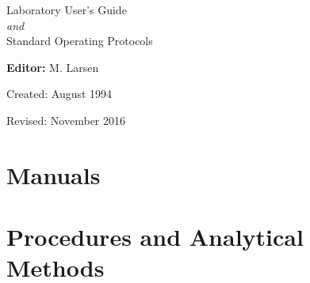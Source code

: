 \documentclass{WSLsop}
\begin{document}
\hfill
\vspace{50mm}

\begin{center}
	\Huge{Laboratory User's Guide} \\ 
	\Large\normalfont\textit{and} \\ 
	\Huge{Standard Operating Protocols}
	
	\vspace{15mm}
	
	\normalsize\textbf{Editor:} M. Larsen
	
	\vspace{15mm}
	Created: August 1994
	
	Revised: November 2016
	
	\contact{} 
\end{center}		
		
\tableofcontents
\clearpage


\part{Manuals}





\hypertarget{Analytical}{\part{Procedures and Analytical Methods}}

\end{document}
